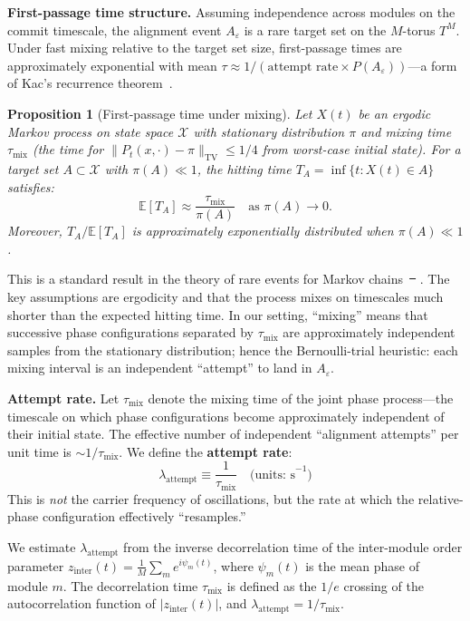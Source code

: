 \documentclass[12pt]{article}
\makeatletter
\newtheorem{proposition}{Proposition}
\providecommand{\DIFaddtex}[1]{{\protect\color{blue}\uwave{#1}}} %
\providecommand{\DIFdeltex}[1]{{\protect\color{red}\sout{#1}}} %
\providecommand{\DIFaddbegin}{} %
\providecommand{\DIFaddend}{} %
\providecommand{\DIFdelbegin}{} %
\providecommand{\DIFdelend}{} %
\providecommand{\DIFadd}[1]{\texorpdfstring{\DIFaddtex{#1}}{#1}} %
\providecommand{\DIFdel}[1]{\texorpdfstring{\DIFdeltex{#1}}{}} %
\providecommand{\DIFscaledelfig}{0.5}
\newlength{\DIFdelgraphicswidth} %
\newlength{\DIFdelgraphicsheight} %
\providecommand{\DIFaddincludegraphics}[2][]{{\color{blue}\fbox{\DIFOincludegraphics[#1]{#2}}}} %
\providecommand{\DIFdelincludegraphics}[2][]{%
\sbox{\DIFdelgraphicsbox}{\DIFOincludegraphics[#1]{#2}}%
\settoboxwidth{\DIFdelgraphicswidth}{\DIFdelgraphicsbox} %
\settoboxtotalheight{\DIFdelgraphicsheight}{\DIFdelgraphicsbox} %
\scalebox{\DIFscaledelfig}{%
\parbox[b]{\DIFdelgraphicswidth}{\usebox{\DIFdelgraphicsbox}\\[-\baselineskip] \rule{\DIFdelgraphicswidth}{0em}}\llap{\resizebox{\DIFdelgraphicswidth}{\DIFdelgraphicsheight}{%
\setlength{\unitlength}{\DIFdelgraphicswidth}%
\begin{picture}(1,1)%
\thicklines\linethickness{2pt} %
{\color[rgb]{1,0,0}\put(0,0){\framebox(1,1){}}}%
{\color[rgb]{1,0,0}\put(0,0){\line( 1,1){1}}}%
{\color[rgb]{1,0,0}\put(0,1){\line(1,-1){1}}}%
\end{picture}%
}\hspace*{3pt}}} %
} %
\DeclareRobustCommand{\DIFaddbegin}{\DIFOaddbegin \let\includegraphics\DIFaddincludegraphics} %
\DeclareRobustCommand{\DIFaddend}{\DIFOaddend \let\includegraphics\DIFOincludegraphics} %
\DeclareRobustCommand{\DIFdelbegin}{\DIFOdelbegin \let\includegraphics\DIFdelincludegraphics} %
\DeclareRobustCommand{\DIFdelend}{\DIFOaddend \let\includegraphics\DIFOincludegraphics} %
\let\sout@orig\sout %
\renewcommand{\sout}[1]{\ifmmode\text{\sout@orig{\ensuremath{#1}}}\else\sout@orig{#1}\fi} %
\makeatother
\begin{document}
\textbf{First-passage time structure.} Assuming independence across modules on the commit timescale, the alignment event $A_\varepsilon$ is a rare target set on the $M$-torus $T^M$. Under fast mixing relative to the target set size, first-passage times are approximately exponential with mean $\tau \approx 1/(\text{attempt rate} \times P(A_\varepsilon))$---a form of Kac's recurrence theorem~\cite{kac1947}.

\begin{proposition}[First-passage time under mixing]\label{prop:fpt}
Let $X(t)$ be an ergodic Markov process on state space $\mathcal{X}$ with stationary distribution $\pi$ and mixing time $\tau_{\mathrm{mix}}$ (the time for $\|P_t(x, \cdot) - \pi\|_{\mathrm{TV}} \leq 1/4$ from worst-case initial state). For a target set $A \subset \mathcal{X}$ with $\pi(A) \ll 1$, the hitting time $T_A = \inf\{t : X(t) \in A\}$ satisfies:
\[
\mathbb{E}[T_A] \approx \frac{\tau_{\mathrm{mix}}}{\pi(A)} \quad \text{as } \pi(A) \to 0.
\]
Moreover, $T_A / \mathbb{E}[T_A]$ is approximately exponentially distributed when $\pi(A) \ll 1$.
\end{proposition}
\noindent This is a standard result in the theory of rare events for Markov chains~\DIFdelbegin \DIFdel{\mbox{%
\cite{kac1947}}\hskip0pt%
}\DIFdelend \DIFaddbegin \DIFadd{\mbox{%
\cite{kac1947,levinperes2017}}\hskip0pt%
}\DIFaddend . The key assumptions are ergodicity and that the process mixes on timescales much shorter than the expected hitting time. In our setting, ``mixing'' means that successive phase configurations separated by $\tau_{\mathrm{mix}}$ are approximately independent samples from the stationary distribution; hence the Bernoulli-trial heuristic: each mixing interval is an independent ``attempt'' to land in $A_\varepsilon$.

\textbf{Attempt rate.} Let $\tau_{\mathrm{mix}}$ denote the mixing time of the joint phase process---the timescale on which phase configurations become approximately independent of their initial state. The effective number of independent ``alignment attempts'' per unit time is $\sim 1/\tau_{\mathrm{mix}}$. We define the \textbf{attempt rate}:
\[
\lambda_{\mathrm{attempt}} \equiv \frac{1}{\tau_{\mathrm{mix}}} \quad \text{(units: s}^{-1}\text{)}
\]
This is \emph{not} the carrier frequency of oscillations, but the rate at which the relative-phase configuration effectively ``resamples.''

We estimate $\lambda_{\mathrm{attempt}}$ from the inverse decorrelation time of the inter-module order parameter $z_{\mathrm{inter}}(t) = \frac{1}{M}\sum_m e^{i\psi_m(t)}$, where $\psi_m(t)$ is the mean phase of module $m$. The decorrelation time $\tau_{\mathrm{mix}}$ is defined as the $1/e$ crossing of the autocorrelation function of $|z_{\mathrm{inter}}(t)|$, and $\lambda_{\mathrm{attempt}} = 1/\tau_{\mathrm{mix}}$.
\end{document}
